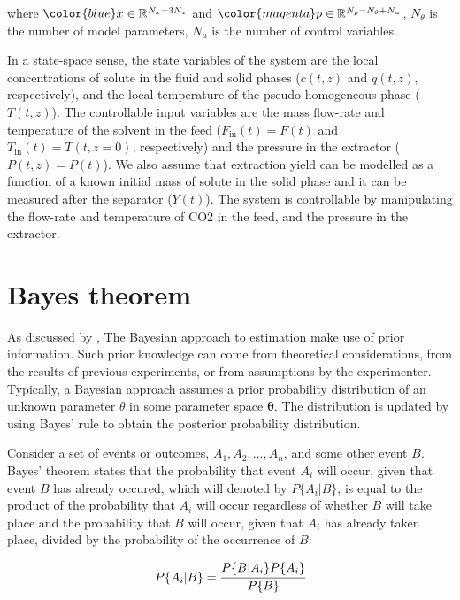 \documentclass[a4paper,fleqn]{cas-dc}
\begin{document}
where ${\color{blue}x} \in \mathbb{R}^{N_x = 3N_z} $ and ${\color{magenta}p} \in \mathbb{R}^{N_p =  N_{\theta} + N_u } $, $N_{\theta}$ is the number of model parameters, $N_{u}$ is the number of control variables.

{\color{blue} In a state-space sense, the state variables of the system are the local concentrations of solute in the fluid and solid phases ($c(t,z)$ and $q(t,z)$, respectively), and the local temperature of the pseudo-homogeneous phase ($T(t,z)$). The controllable input variables are the mass flow-rate and temperature of the solvent in the feed ($F_\text{in}(t) = F(t)$ and $T_\text{in}(t) = T(t,z=0)$, respectively) and the pressure in the extractor ($P(t,z) = P(t)$). {\color{red}We also assume that extraction yield can be modelled as a function of a known initial mass of solute in the solid phase and it can be measured after the separator ($Y(t)$).} The system is controllable by manipulating the flow-rate and temperature of CO2 in the feed, and the pressure in the extractor. }

\newpage
\section{Bayes theorem} \label{CH: Bayes}

As discussed by \citet{Himmelblau1970}, The Bayesian approach to estimation make use of prior information. Such prior knowledge can come from theoretical considerations, from the results of previous experiments, or from assumptions by the experimenter. Typically, a Bayesian approach assumes a prior probability distribution of an unknown parameter $\theta$ in some parameter space $\boldsymbol{\theta}$. The distribution is updated by using Bayes' rule to obtain the posterior probability distribution. 

Consider a set of events or outcomes, $A_1,A_2,...,A_n$, and some other event $B$. Bayes' theorem states that the probability that event $A_i$ will occur, given that event $B$ has already occured, which will denoted by $P\{A_i|B\}$, is equal to the product of the probability that $A_i$ will occur regardless of whether $B$ will take place and the probability that $B$ will occur, given that $A_i$  has already taken place, divided by the probability of the occurrence of $B$:

{\footnotesize
\begin{equation}
	P\{A_i|B\} = \cfrac{P\{B|A_i\}P\{A_i\}}{P\{B\}}
\end{equation} }
\end{document}
